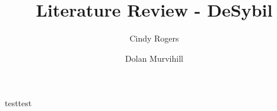 \documentclass{article}
\title{Literature Review - DeSybil}
\author{Cindy Rogers \and Dolan Murvihill}
\date{}
\begin{document}
testtest
\end{document}
